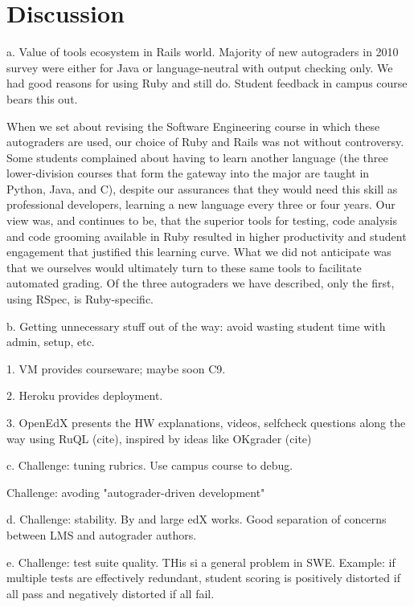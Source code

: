 \section{Discussion}



a.	Value of tools ecosystem in Rails world. Majority of new autograders in 2010 survey were either for Java or language-neutral with output checking only. We had good reasons for using Ruby and still do. Student feedback in campus course bears this out.


When we set about revising the Software Engineering course in which
these autograders are used, our choice of Ruby and Rails was not without
controversy.  Some students complained about having to learn another
language (the three lower-division courses that form the gateway into
the major are taught in Python, Java, and C), despite our assurances
that they would need this skill  as professional developers, learning a
new language every three or four years.  Our view was, and continues to
be, that the superior tools for testing, code analysis and code grooming
available in Ruby resulted in higher productivity and student engagement
that justified this learning curve.  What we did not anticipate was that
we ourselves would ultimately turn to these same tools to facilitate
automated grading.  Of the three autograders we have described, only the
first, using RSpec, is Ruby-specific.



b.	Getting unnecessary stuff out of the way: avoid wasting student time with admin, setup, etc.  

1.	VM provides courseware; maybe soon C9.  

2.	Heroku provides deployment.  

3.	OpenEdX presents the HW explanations, videos, selfcheck questions along the way using RuQL (cite), inspired by ideas like OKgrader (cite)

c.	Challenge: tuning rubrics. Use campus course to debug.

Challenge: avoding "autograder-driven development"


d.	Challenge: stability. By and large edX works.  Good separation
of concerns between LMS and autograder authors.

e.	Challenge: test suite quality. THis si a general problem in SWE. Example: if multiple tests are effectively redundant, student scoring is positively distorted if all pass and negatively distorted if all fail.



